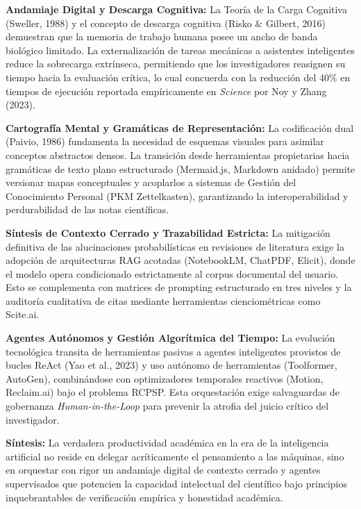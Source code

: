 \begin{resumenlist}[topsep=0.08cm, itemsep=0.08cm, parsep=0pt]
    \item \textbf{Andamiaje Digital y Descarga Cognitiva:} La Teoría de la Carga Cognitiva (Sweller, 1988) y el concepto de descarga cognitiva (Risko \& Gilbert, 2016) demuestran que la memoria de trabajo humana posee un ancho de banda biológico limitado. La externalización de tareas mecánicas a asistentes inteligentes reduce la sobrecarga extrínseca, permitiendo que los investigadores reasignen su tiempo hacia la evaluación crítica, lo cual concuerda con la reducción del 40\% en tiempos de ejecución reportada empíricamente en \textit{Science} por Noy y Zhang (2023).
    \item \textbf{Cartografía Mental y Gramáticas de Representación:} La codificación dual (Paivio, 1986) fundamenta la necesidad de esquemas visuales para asimilar conceptos abstractos densos. La transición desde herramientas propietarias hacia gramáticas de texto plano estructurado (Mermaid.js, Markdown anidado) permite versionar mapas conceptuales y acoplarlos a sistemas de Gestión del Conocimiento Personal (PKM Zettelkasten), garantizando la interoperabilidad y perdurabilidad de las notas científicas.
    \item \textbf{Síntesis de Contexto Cerrado y Trazabilidad Estricta:} La mitigación definitiva de las alucinaciones probabilísticas en revisiones de literatura exige la adopción de arquitecturas RAG acotadas (NotebookLM, ChatPDF, Elicit), donde el modelo opera condicionado estrictamente al corpus documental del usuario. Esto se complementa con matrices de prompting estructurado en tres niveles y la auditoría cualitativa de citas mediante herramientas cienciométricas como Scite.ai.
    \item \textbf{Agentes Autónomos y Gestión Algorítmica del Tiempo:} La evolución tecnológica transita de herramientas pasivas a agentes inteligentes provistos de bucles ReAct (Yao et al., 2023) y uso autónomo de herramientas (Toolformer, AutoGen), combinándose con optimizadores temporales reactivos (Motion, Reclaim.ai) bajo el problema RCPSP. Esta orquestación exige salvaguardas de gobernanza \textit{Human-in-the-Loop} para prevenir la atrofia del juicio crítico del investigador.
\end{resumenlist}

\vspace{0.3cm}
\begin{cajabeige}
\textbf{Síntesis:} La verdadera productividad académica en la era de la inteligencia artificial no reside en delegar acríticamente el pensamiento a las máquinas, sino en orquestar con rigor un andamiaje digital de contexto cerrado y agentes supervisados que potencien la capacidad intelectual del científico bajo principios inquebrantables de verificación empírica y honestidad académica.
\end{cajabeige}

